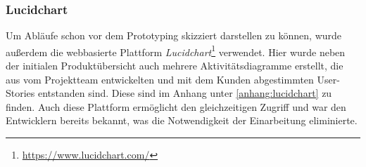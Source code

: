 \documentclass[10pt, a4paper]{article}
\begin{document}
\begin{onehalfspace}
      \subsubsection{Lucidchart}
      \label{Lucidchart}
      Um Abläufe schon vor dem Prototyping skizziert darstellen zu können, wurde außerdem die webbasierte Plattform \textit{Lucidchart}\footnote{\raggedright\url{https://www.lucidchart.com/}} verwendet.
      Hier wurde neben der initialen Produktübersicht auch mehrere Aktivitätsdiagramme erstellt, die aus vom Projektteam entwickelten und mit dem Kunden abgestimmten User-Stories entstanden sind.
      Diese sind im Anhang unter \autoref{anhang:lucidchart} zu finden.
      Auch diese Plattform ermöglicht den gleichzeitigen Zugriff und war den Entwicklern bereits bekannt, was die Notwendigkeit der Einarbeitung eliminierte.


\end{onehalfspace}
\end{document}
